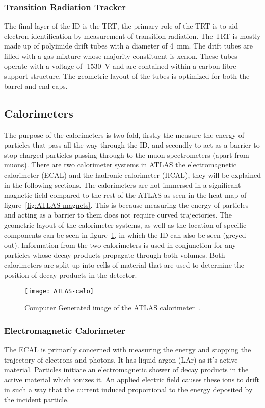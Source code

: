 \subsubsection{Transition Radiation Tracker}

The final layer of the ID is the TRT, the primary role of the TRT is to aid
electron identification by measurement of transition radiation. The TRT is
mostly made up of polyimide drift tubes with a diameter of 4~mm. The drift tubes
are filled with a gas mixture whose majority constituent is xenon. These tubes
operate with a voltage of -1530~V and are contained within a carbon fibre
support structure. The geometric layout of the tubes is optimized for
both the barrel and end-caps.



\subsection{Calorimeters}%
\label{sec:calo}

The purpose of the calorimeters is two-fold, firstly the measure the energy of
particles that pass all the way through the ID, and secondly to act as a barrier
to stop charged particles passing through to the muon spectrometers (apart from
muons). There are two calorimeter systems in ATLAS the electromagnetic
calorimeter (ECAL) and the hadronic calorimeter (HCAL), they will be explained
in the following sections. The calorimeters are not immersed in a significant magnetic
field compared to the rest of the ATLAS as seen in the heat map of
figure~\ref{fig:ATLAS-magnets}. This is because measuring the energy of
particles and acting as a barrier to them does not require curved trajectories.
The geometric layout of the calorimeter systems, as well as the location of
specific components can be seen in figure~\ref{fig:ATLAS-calo}, in which the ID
can also be seen (greyed out). Information from the two calorimeters is used in
conjunction for any particles whose decay products propagate through both
volumes. Both calorimeters are split up into cells of material that are used to
determine the position of decay products in the detector.
\begin{figure}[h]
  \centering
  \texttt{[image: ATLAS-calo]}
  \caption[ATLAS Calorimeter]{Computer Generated image of the ATLAS
    calorimeter~\cite{ATLAS-calo-fig}.}%
  \label{fig:ATLAS-calo}
\end{figure}

\subsubsection{Electromagnetic Calorimeter}
The ECAL is primarily concerned with measuring the energy and stopping the
trajectory of electrons and photons. It has liquid argon (LAr) as it's active
material. Particles initiate an electromagnetic shower of decay products in the
active material which ionizes it. An applied electric field causes these ions to
drift in such a way that the current induced proportional to the energy
deposited by the incident particle.

